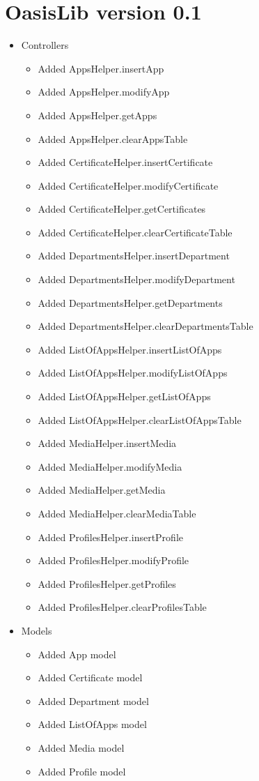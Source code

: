 \section{OasisLib version 0.1}
\begin{itemize}
	\item Controllers
	\begin{itemize}
		\item Added AppsHelper.insertApp
		\item Added AppsHelper.modifyApp
		\item Added AppsHelper.getApps
		\item Added AppsHelper.clearAppsTable
		\item Added CertificateHelper.insertCertificate
		\item Added CertificateHelper.modifyCertificate
		\item Added CertificateHelper.getCertificates
		\item Added CertificateHelper.clearCertificateTable
		\item Added DepartmentsHelper.insertDepartment
		\item Added DepartmentsHelper.modifyDepartment
		\item Added DepartmentsHelper.getDepartments
		\item Added DepartmentsHelper.clearDepartmentsTable
		\item Added ListOfAppsHelper.insertListOfApps
		\item Added ListOfAppsHelper.modifyListOfApps
		\item Added ListOfAppsHelper.getListOfApps
		\item Added ListOfAppsHelper.clearListOfAppsTable
		\item Added MediaHelper.insertMedia
		\item Added MediaHelper.modifyMedia
		\item Added MediaHelper.getMedia
		\item Added MediaHelper.clearMediaTable
		\item Added ProfilesHelper.insertProfile
		\item Added ProfilesHelper.modifyProfile
		\item Added ProfilesHelper.getProfiles
		\item Added ProfilesHelper.clearProfilesTable
	\end{itemize}
	\item Models
	\begin{itemize}
		\item Added App model
		\item Added Certificate model
		\item Added Department model
		\item Added ListOfApps model
		\item Added Media model
		\item Added Profile model
	\end{itemize}
\end{itemize}


